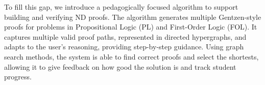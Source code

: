 
To fill this gap, we introduce a pedagogically focused algorithm to support building and verifying ND proofs. The algorithm generates multiple Gentzen-style proofs for problems in Propositional Logic (PL) and First-Order Logic (FOL). It captures multiple valid proof paths, represented in directed hypergraphs, and adapts to the user’s reasoning, providing step-by-step guidance. Using graph search methods, the system is able to find correct proofs and select the  shortests, allowing it to give feedback on how good the solution is and track student progress.
